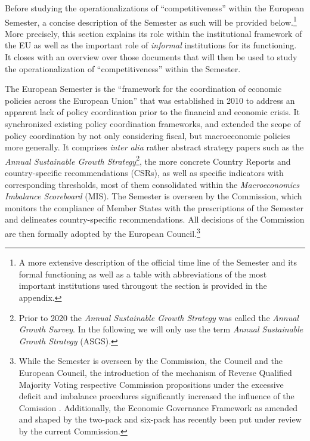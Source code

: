 \documentclass[
]{article}
\begin{document}
Before studying the operationalizations of
\enquote{competitiveness} within the European Semester, a concise description of
the Semester as such will be provided below.\footnote{A more extensive description of the official time line
  of the Semester and its formal functioning as well as a table with abbreviations
  of the most important institutions used througout the section
  is provided in the appendix.}
More precisely, this section explains its role within the institutional
framework of the EU as well as the important role of
\emph{informal} institutions for its functioning.
It closes with an overview over those documents
that will then be used to study the operationalization of
\enquote{competitiveness} within the Semester.

The European Semester is the \enquote{framework for the coordination of economic
policies across the European Union}
\citep{EuropeanCommission:EuropeanSemester} that
was established in 2010 to address an apparent lack of policy coordination
prior to the financial and economic crisis.
It synchronized existing policy coordination
frameworks, and extended the scope of policy coordination by not only
considering fiscal, but macroeconomic policies more generally.
It comprises \emph{inter alia} rather abstract strategy papers
such as the \emph{Annual Sustainable Growth Strategy}\footnote{Prior to 2020 the \emph{Annual Sustainable Growth Strategy} was called the
  \emph{Annual Growth Survey}. In the following we
  will only use the term \emph{Annual Sustainable Growth Strategy} (ASGS).}, the more concrete Country Reports and country-specific recommendations (CSRs), as well
as specific indicators with corresponding thresholds, most of them consolidated
within the \emph{Macroeconomics Imbalance Scoreboard} (MIS).
The Semester is overseen by the Commission, which monitors the compliance of
Member States with the prescriptions of the Semester and delineates
country-specific recommendations.
All decisions of the Commission are then formally adopted
by the European Council.\footnote{While the Semester is overseen by the Commission, the
  Council and the European Council, the introduction of the mechanism of
  Reverse Qualified Majority Voting
  respective Commission propositions under the excessive
  deficit and imbalance procedures significantly increased the influence
  of the Comission \citep{Aken2013}. Additionally, the Economic Governance Framework as amended and shaped by the two-pack and six-pack has recently been put under review by the current Commission.}
\end{document}
